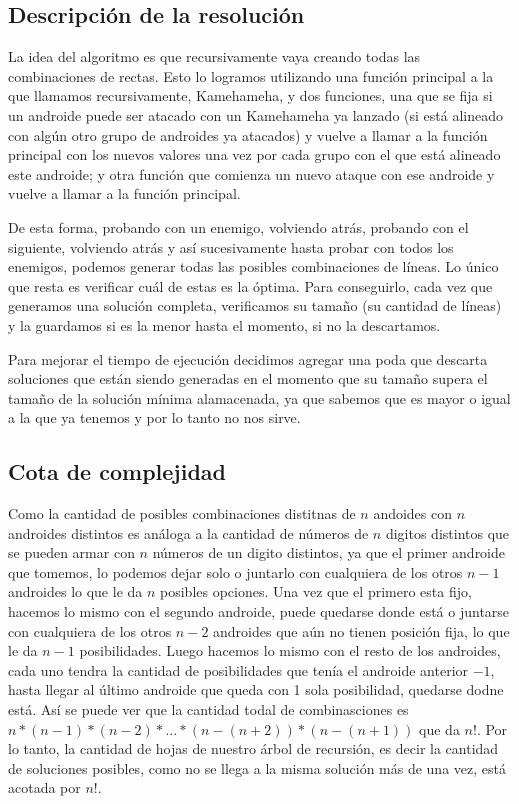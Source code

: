 \subsection{Descripción de la resolución}
La idea del algoritmo es que recursivamente vaya creando todas las combinaciones de rectas. Esto lo logramos utilizando una función principal a la que llamamos recursivamente, Kamehameha,  y dos funciones, una que se fija si un androide puede ser atacado con un Kamehameha ya lanzado (si está alineado con algún otro grupo de androides ya atacados) y vuelve a llamar a la función principal con los nuevos valores una vez por cada grupo con el que está alineado este androide; y otra función que comienza un nuevo ataque con ese androide y vuelve a llamar a la función principal.
\par{De esta forma, probando con un enemigo, volviendo atrás, probando con el siguiente, volviendo atrás y así sucesivamente hasta probar con todos los enemigos, podemos generar todas las posibles combinaciones de líneas. Lo único que resta es verificar cuál de estas es la óptima. Para conseguirlo, cada vez que generamos una solución completa, verificamos su tamaño (su cantidad de líneas) y la guardamos si es la menor hasta el momento, si no la descartamos.}
\par{Para mejorar el tiempo de ejecución decidimos agregar una poda que descarta soluciones que están siendo generadas en el momento que su tamaño supera el tamaño de la solución mínima alamacenada, ya que sabemos que es mayor o igual a la que ya tenemos y por lo tanto no nos sirve.}

\subsection{Cota de complejidad}
Como la cantidad de posibles combinaciones distitnas de $n$ andoides con $n$ androides distintos es análoga a la cantidad de números de $n$ digitos distintos que se pueden armar con $n$ números de un digito distintos, ya que el primer androide que tomemos, lo podemos dejar solo o juntarlo con cualquiera de los otros $n-1$ androides lo que le da $n$ posibles opciones. Una vez que el primero esta fijo, hacemos lo mismo con el segundo androide, puede quedarse donde está o juntarse con cualquiera de los otros $n-2$ androides que aún no tienen posición fija, lo que le da $n-1$ posibilidades. Luego hacemos lo mismo con el resto de los androides, cada uno tendra la cantidad de posibilidades que tenía el androide anterior $-1$, hasta llegar al último androide que queda con 1 sola posibilidad, quedarse dodne está. Así se puede ver que la cantidad todal de combinasciones es $n*(n-1)*(n-2)*...*(n-(n+2))*(n-(n+1))$ que da $n!$.
Por lo tanto, la cantidad de hojas de nuestro árbol de recursión, es decir la cantidad de soluciones posibles, como no se llega a la misma solución más de una vez, está acotada por $n!$.

